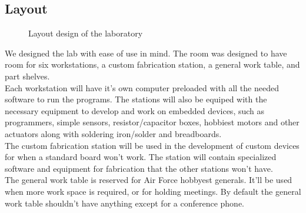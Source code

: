 \documentclass[12pt]{article}
\begin{document}
\subsection{Layout}

\begin{figure}[h!]
  \centering
  \label{fig:layout}
  \caption{Layout design of the laboratory}
\end{figure}
\noindent
We designed the lab with ease of use in mind. The room was designed to have room for six workstations, a custom fabrication station, a general work table, and part shelves.  \\

\noindent
Each workstation will have it's own computer preloaded with all the needed software to run the programs. The stations will also be equiped with the necessary equipment to develop and work on embedded devices, such as programmers, simple sensors, resistor/capacitor boxes, hobbiest motors and other actuators along with soldering iron/solder and breadboards. \\

\noindent
The custom fabrication station will be used in the development of custom devices for when a standard board won't work. The station will contain specialized software and equipment for fabrication that the other stations won't have.\\

\noindent
The general work table is reserved for Air Force hobbyest generals. It'll be used when more work space is required, or for holding meetings. By default the general work table shouldn't have anything except for a conference phone.
\end{document}
